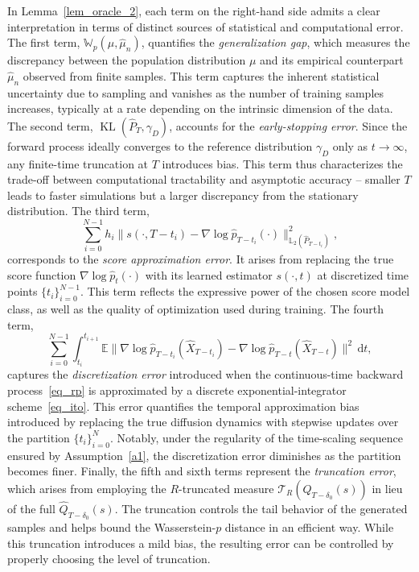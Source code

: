 \documentclass[12pts]{article}
\newcommand{\diff}{\mathrm{d}}
\newcommand{\sT}{ \mathscr{T}}
\newcommand{\hP}{ \hat{P}}
\newcommand{\hQ}{ \hat{Q}}
\newcommand{\hX}{ \widehat{X}}
\newcommand{\hmu}{\hat{\mu}}
\newcommand{\E}{\mathbb{E}}
\newcommand{\fL}{\mathbb{L}}
\newcommand{\fW}{\mathbb{W}}
\newcommand{\hp}{\hat{p}}
\newcommand{\kl}{\operatorname{KL}}
\begin{document}
In Lemma~\ref{lem_oracle_2}, each term on the right-hand side admits a clear interpretation in terms of distinct sources of statistical and computational error. The first term, $\fW_p(\mu, \hmu_n)$, quantifies the \textit{generalization gap}, which measures the discrepancy between the population distribution $\mu$ and its empirical counterpart $\hmu_n$ observed from finite samples. This term captures the inherent statistical uncertainty due to sampling and vanishes as the number of training samples increases, typically at a rate depending on the intrinsic dimension of the data. The second term, $\kl(\hP_T, \gamma_D)$, accounts for the \textit{early-stopping error}. Since the forward process ideally converges to the reference distribution $\gamma_D$ only as $t \to \infty$, any finite-time truncation at $T$ introduces bias. This term thus characterizes the trade-off between computational tractability and asymptotic accuracy -- smaller $T$ leads to faster simulations but a larger discrepancy from the stationary distribution. The third term,
\begin{equation}
    \sum_{i=0}^{N-1} h_i \|s(\cdot, T-t_i) - \nabla \log \hp_{T-t_i}(\cdot)\|^2_{\fL_2(\hP_{T-t_i})}, \label{eq_approx_err}
\end{equation}
corresponds to the \textit{score approximation error}. It arises from replacing the true score function $\nabla \log \hp_t(\cdot)$ with its learned estimator $s(\cdot, t)$ at discretized time points $\{t_i\}_{i=0}^{N-1}$. This term reflects the expressive power of the chosen score model class, as well as the quality of optimization used during training.  The fourth term,
\[
\sum_{i=0}^{N-1}\int_{t_i}^{t_{i+1}} \E\|\nabla \log \hp_{T-t_i}(\hX_{T-t_i}) - \nabla \log \hp_{T-t}(\hX_{T-t})\|^2 \, \diff t,
\]
captures the \textit{discretization error} introduced when the continuous-time backward process~\eqref{eq_rp} is approximated by a discrete exponential-integrator scheme~\eqref{eq_ito}. This error quantifies the temporal approximation bias introduced by replacing the true diffusion dynamics with stepwise updates over the partition $\{t_i\}_{i=0}^N$. Notably, under the regularity of the time-scaling sequence ensured by Assumption~\ref{a1}, the discretization error diminishes as the partition becomes finer. Finally, the fifth and sixth terms represent the \textit{truncation error}, which arises from employing the $R$-truncated measure $\sT_R(\hQ_{T-\delta_0}(s))$ in lieu of the full $\hQ_{T-\delta_0}(s)$. The truncation controls the tail behavior of the generated samples and helps bound the Wasserstein-$p$ distance in an efficient way. While this truncation introduces a mild bias, the resulting error can be controlled by properly choosing the level of truncation. 
\end{document}
